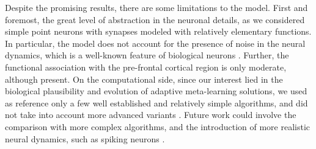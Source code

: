 Despite the promising results, there are some limitations to the model. First and foremost, the great level of abstraction in the neuronal details, as we considered simple point neurons with synapses modeled with relatively elementary functions.
In particular, the model does not account for the presence of noise in the neural dynamics, which is a well-known feature of biological neurons \cite{faisalNoiseNeuronsOther2012}.
Further, the functional association with the pre-frontal cortical region is only moderate, although present.
On the computational side, since our interest lied in the biological plausibility and evolution of adaptive meta-learning solutions, we used as reference only a few well established and relatively simple algorithms, and did not take into account more advanced variants
\cite{tokicAdaptiveEGreedyExploration2010, tokicValueDifferenceBasedExploration2011, qiForcedExplorationBandit2023}.
Future work could involve the comparison with more complex algorithms, and the introduction of more realistic neural dynamics, such as spiking neurons \cite{nunesSpikingNeuralNetworks2022}.

